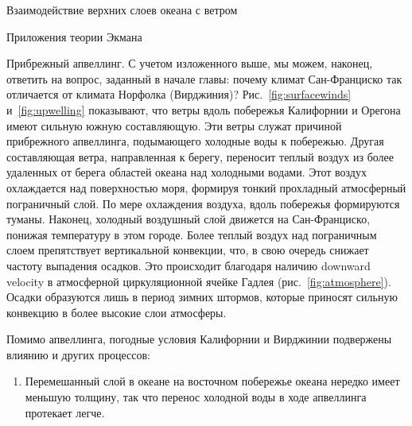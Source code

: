 \begin{chapter}{Взаимодействие верхних слоев океана с ветром}
\begin{section}{Приложения теории Экмана}
\begin{paragraph}{Прибрежный апвеллинг.}
С учетом изложенного выше, мы можем, наконец, ответить на вопрос, заданный
в начале главы: почему климат Сан-Франциско так отличается от климата 
Норфолка (Вирджиния)? Рис.~\ref{fig:surfacewinds} и~\ref{fig:upwelling}
показывают, что ветры вдоль побережья Калифорнии и Орегона имеют сильную
южную составляющую. Эти ветры служат причиной прибрежного 
апвеллинга, подымающего холодные воды 
к побережью. Другая составляющая ветра, направленная к берегу, переносит
теплый воздух из более удаленных от берега областей океана над холодными водами. Этот воздух охлаждается над поверхностью моря, формируя тонкий
прохладный атмосферный пограничный слой. По мере охлаждения воздуха, вдоль
побережья формируются туманы. Наконец, холодный воздушный слой движется на
Сан-Франциско, понижая температуру в этом городе. Более теплый воздух над
пограничным слоем препятствует вертикальной конвекции, что, в свою очередь
снижает частоту выпадения осадков. Это происходит благодаря наличию
downward velocity в атмосферной циркуляционной ячейке 
Гадлея (рис.~\ref{fig:atmosphere}). Осадки образуются лишь в период зимних
штормов, которые приносят сильную конвекцию в более высокие слои атмосферы.
%

Помимо апвеллинга, погодные условия Калифорнии
и Вирджинии подвержены влиянию и других процессов:
%
%
\begin{enumerate}
\item 
Перемешанный слой в океане 
на восточном побережье океана нередко имеет меньшую толщину, так что перенос
холодной воды в ходе апвеллинга протекает легче.
%


\end{enumerate}
\end{paragraph}
\end{section}
\end{chapter}
